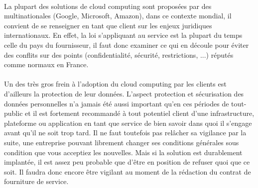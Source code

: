 \documentclass[a4paper,12pt]{report}
\begin{document}
\begin{onehalfspace}
	\paragraph*{}
	La plupart des solutions de cloud computing sont proposées par des multinationales (Google, Microsoft, Amazon), dans ce contexte mondial, il convient de se renseigner en tant que client sur les enjeux juridiques internationaux. En effet, la loi s’appliquant au service est la plupart du temps celle du pays du fournisseur, il faut donc examiner ce qui en découle pour éviter des conflits sur des points (confidentialité, sécurité, restrictions, ...) réputés comme normaux en France.
	
	\paragraph*{}
	Un des très gros frein à l’adoption du cloud computing par les clients est d’ailleurs la protection de leur données. L'aspect protection et sécurisation des données personnelles n'a jamais été aussi important qu'en ces périodes de tout-public et il est fortement recommandé à tout potentiel client d'une infrastructure, plateforme ou application en tant que service de bien savoir dans quoi il s'engage avant qu'il ne soit trop tard. Il ne faut toutefois pas relâcher sa vigilance par la suite, une entreprise pouvant librement changer ses conditions générales sous condition que vous acceptiez les nouvelles. Mais si la solution est durablement implantée, il est assez peu probable que d’être en position de refuser quoi que ce soit. Il faudra donc encore être vigilant au moment de la rédaction du contrat de fourniture de service.


\end{onehalfspace}
\end{document}
